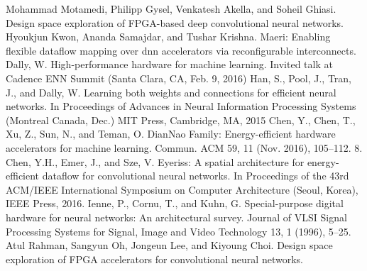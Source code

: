 \begin{thebibliography}{69}
 Mohammad Motamedi, Philipp Gysel, Venkatesh Akella, and Soheil Ghiasi. Design space exploration of FPGA-based deep convolutional  neural networks.  
 Hyoukjun Kwon, Ananda Samajdar, and Tushar Krishna. Maeri: Enabling flexible dataflow mapping over dnn accelerators via reconfigurable interconnects.
 Dally, W. High-performance hardware for machine learning. Invited talk at Cadence ENN Summit (Santa Clara, CA, Feb. 9, 2016)
 Han, S., Pool, J., Tran, J., and Dally, W. Learning both weights  and connections for efficient neural networks. In Proceedings of Advances in Neural Information Processing Systems (Montreal Canada, Dec.) MIT Press, Cambridge, MA, 2015
 Chen, Y., Chen, T., Xu, Z., Sun, N., and Teman, O. DianNao Family: Energy-efficient hardware accelerators for machine learning. Commun. ACM 59, 11 (Nov. 2016), 105–112. 8. Chen, Y.H., Emer, J., and Sze, V. Eyeriss: A spatial architecture for energy-efficient dataflow for  convolutional neural networks. In Proceedings of the 43rd ACM/IEEE International Symposium on Computer Architecture (Seoul, Korea), IEEE Press, 2016.
 Ienne, P., Cornu, T., and Kuhn, G. Special-purpose digital hardware for neural networks: An architectural survey. Journal of VLSI Signal Processing Systems for Signal, Image and Video Technology 13, 1 (1996), 5–25.
 Atul Rahman, Sangyun Oh, Jongeun Lee, and Kiyoung Choi. Design space exploration of FPGA accelerators for convolutional neural networks.  





\end{thebibliography}
